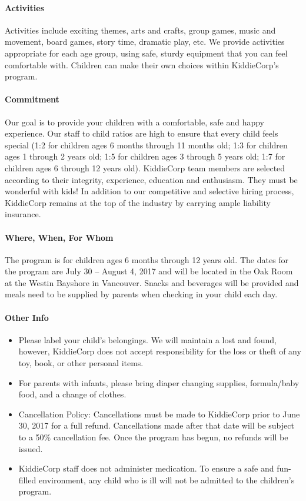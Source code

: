 \paragraph{Activities} Activities include exciting themes, arts  and  crafts, group games, music  and  movement, board games, story time, dramatic play, etc. We provide activities appropriate for each age group, using safe, sturdy equipment that you can feel comfortable with. Children can make their own choices within KiddieCorp's program.

\paragraph{Commitment }
Our goal is to provide your children with a comfortable, safe and happy experience. Our staff to child ratios are high to ensure that every child feels special (1:2 for children ages 6 months through 11 months old; 1:3 for children ages 1 through 2 years old; 1:5 for children ages 3 through 5 years old; 1:7 for children ages 6 through 12 years old). KiddieCorp team members are selected according to their integrity, experience, education and enthusiasm. They must be wonderful with kids! In addition to our competitive and selective hiring process, KiddieCorp remains at the top of the industry by carrying ample liability insurance.


\paragraph{Where, When, For Whom}
The program is for children ages 6 months through 12 years old. The dates for the program are July 30 -- August 4, 2017 and will be located in the Oak Room at the Westin Bayshore in Vancouver. Snacks and beverages will be provided and meals need to be supplied by parents when checking in your child each day.

\paragraph{Other Info}
\begin{itemize}
\item Please label your child's belongings. We will maintain a lost and found, however, KiddieCorp does not accept responsibility for the loss or theft of any toy, book, or other personal items.
\item For parents with infants, please bring diaper changing supplies, formula/baby food, and a change of clothes.
\item Cancellation Policy: Cancellations must be made to KiddieCorp prior to June 30, 2017 for a full refund. Cancellations made after that date will be subject to a 50\% cancellation fee. Once the program has begun, no refunds will be issued.
\item KiddieCorp staff does not administer medication. To ensure a safe and fun-filled environment, any child who is ill will not be admitted to the children's program.
\end{itemize}


